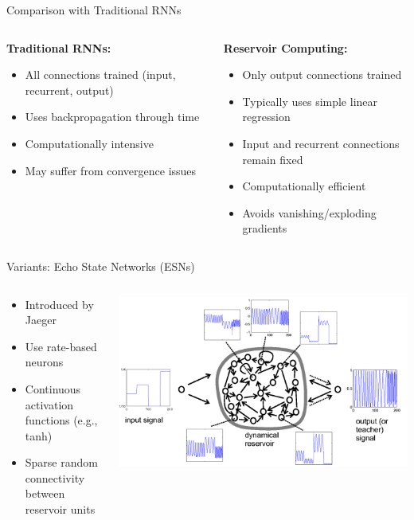 \documentclass{beamer}
\begin{document}
\begin{frame}{Comparison with Traditional RNNs}
\begin{columns}
\begin{column}{0.5\textwidth}
\textbf{Traditional RNNs:}
\begin{itemize}
\item All connections trained (input, recurrent, output)
\item Uses backpropagation through time
\item Computationally intensive
\item May suffer from convergence issues
\end{itemize}
\end{column}
\begin{column}{0.5\textwidth}
\textbf{Reservoir Computing:}
\begin{itemize}
\item Only output connections trained
\item Typically uses simple linear regression
\item Input and recurrent connections remain fixed
\item Computationally efficient
\item Avoids vanishing/exploding gradients
\end{itemize}
\end{column}
\end{columns}
\end{frame}

\begin{frame}{Variants: Echo State Networks (ESNs)}
\begin{columns}
\begin{column}{0.5\textwidth}
\begin{itemize}
\item Introduced by Jaeger
\item Use rate-based neurons
\item Continuous activation functions (e.g., tanh)
\item Sparse random connectivity between reservoir units
\end{itemize}
\end{column}
\begin{column}{0.5\textwidth}
\includegraphics[width=1\linewidth]{figures/ESN_diag_FreqGenSchema.png}
\caption{Echo State Network diagram}
\end{column}
\end{columns}
\end{frame}
\end{document}
